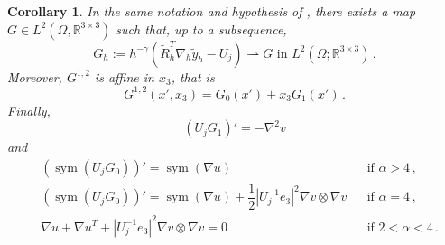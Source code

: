 \documentclass{article}
\theoremstyle{plain}
\theoremstyle{plain}
\newtheorem{cor}[teo]{Corollary}
\theoremstyle{plain}
\theoremstyle{plain}
\theoremstyle{plain}
\theoremstyle{definition}
\theoremstyle{definition}
\renewcommand{\r}{\mathbb{R}}
\newcommand{\todeb}{\rightharpoonup}
\DeclareMathOperator{\sym}{sym}
\begin{document}
\begin{cor}\label{cor:convergence_G}
    In the same notation and hypothesis of , there exists a map $G \in L^2(\Omega, \r^{3 \times 3})$ such that, up to a subsequence,
    \begin{equation}
        G_h := h^{-\gamma}\left(\tilde R_h^T \nabla_h \tilde y_h - U_j\right) \todeb G \, \, \text{in} \, \, L^2(\Omega; \r^{3 \times 3}) \,. \label{eq:convergence_G}
    \end{equation}
    Moreover, $G^{1,2}$ is affine in $x_3$, that is
    \begin{equation}
        G^{1,2}(x', x_3) = G_0(x') + x_3 G_1(x') \,. \label{eq:linearity_G}
    \end{equation}
    Finally,    
    \begin{equation}
        (U_j G_1)' = -\nabla^2 v\label{eq:G1_minor_gamma_greater_1} 
    \end{equation}
    and
    \begin{align}
        & (\sym(U_j G_0))' = \sym(\nabla u) && \text{if} \, \, \alpha > 4\,, \label{eq:G0_minor_b_greater_2} \\
        & (\sym(U_j G_0))' = \sym(\nabla u) + \dfrac{1}{2}|U_j^{-1} e_3|^2 \nabla v \otimes \nabla v && \text{if} \, \, \alpha  = 4\,, \label{eq:G0_minor_b_equals_2}\\
        & \nabla u + \nabla u^T + |U_j^{-1} e_3|^2 \nabla v \otimes \nabla v = 0 && \text{if} \, \, 2 < \alpha  < 4\,. \label{eq:G0_minor_b_less_2}
    \end{align}
\end{cor}
\end{document}
